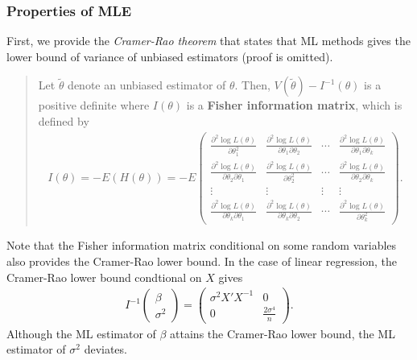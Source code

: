 \documentclass[
  12pt,
]{article}
\begin{document}
\hypertarget{properties-of-mle}{%
\subsubsection{Properties of MLE}\label{properties-of-mle}}

First, we provide the \emph{Cramer-Rao theorem} that states that ML
methods gives the lower bound of variance of unbiased estimators (proof
is omitted).

\begin{quote}
Let \(\tilde{\theta}\) denote an unbiased estimator of \(\theta\). Then,
\(V(\tilde{\theta}) - I^{-1}(\theta)\) is a positive definite where
\(I(\theta)\) is a \textbf{Fisher information matrix}, which is defined
by \begin{align*}
I(\theta) 
= - E (H(\theta)) 
= - E 
\begin{pmatrix}
\frac{\partial^2 \log L(\theta) }{\partial \theta_1^2} &
\frac{\partial^2 \log L(\theta) }{\partial \theta_1 \partial \theta_2} &
\cdots &
\frac{\partial^2 \log L(\theta) }{\partial \theta_1 \partial \theta_k} \\
\frac{\partial^2 \log L(\theta) }{\partial \theta_2 \partial \theta_1} &
\frac{\partial^2 \log L(\theta) }{\partial \theta_2^2} &
\cdots &
\frac{\partial^2 \log L(\theta) }{\partial \theta_2 \partial \theta_k} \\
\vdots & \vdots & \vdots & \vdots \\
\frac{\partial^2 \log L(\theta) }{\partial \theta_k \partial \theta_1} &
\frac{\partial^2 \log L(\theta) }{\partial \theta_k \partial \theta_2} &
\cdots &
\frac{\partial^2 \log L(\theta) }{\partial \theta_k^2}
\end{pmatrix}.
\end{align*}
\end{quote}

Note that the Fisher information matrix conditional on some random
variables also provides the Cramer-Rao lower bound. In the case of
linear regression, the Cramer-Rao lower bound condtional on \(X\) gives
\begin{align*}
  I^{-1} \begin{pmatrix} \beta \\ \sigma^2 \end{pmatrix}
  = 
  \begin{pmatrix} \sigma^2 X'X^{-1} & 0 \\ 0 & \frac{2\sigma^4}{n} \end{pmatrix}.
\end{align*} Although the ML estimator of \(\beta\) attains the
Cramer-Rao lower bound, the ML estimator of \(\sigma^2\) deviates.
\end{document}
